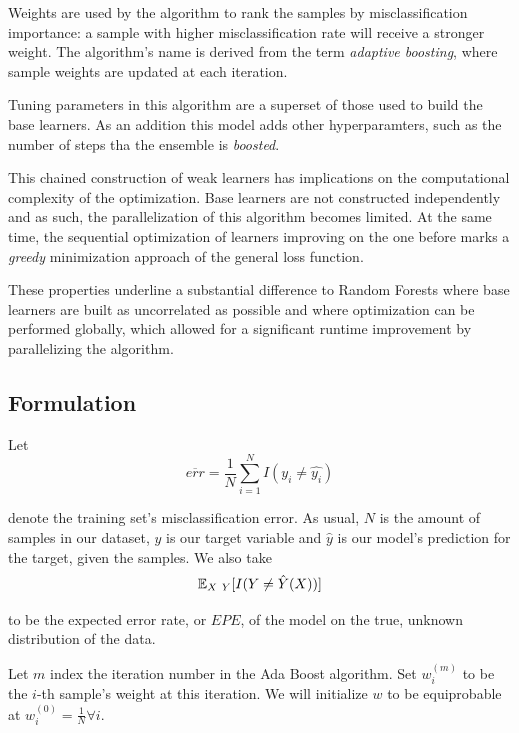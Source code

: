 Weights are used by the algorithm to rank the samples by misclassification importance: a sample with higher misclassification rate will receive a stronger weight.
The algorithm's name is derived from the term \textit{adaptive boosting}, where sample weights are updated at each iteration.

Tuning parameters in this algorithm are a superset of those used to build the base learners.
As an addition this model adds other hyperparamters, such as the number of steps tha the ensemble is \textit{boosted}.

This chained construction of weak learners has implications on the computational complexity of the optimization.
Base learners are not constructed independently and as such, the parallelization of this algorithm becomes limited.
At the same time, the sequential optimization of learners improving on the one before marks a \textit{greedy} minimization approach of the general loss function.

These properties underline a substantial difference to Random Forests where base learners are built as uncorrelated as possible and where optimization can be performed globally, which allowed for a significant runtime improvement by parallelizing the algorithm.

\subsection{Formulation}\label{subsection:adaboost_formulation}

Let
\begin{equation}\label{eq:adaBoostTrainingError}
\overline{err} = \frac{1}{N} \sum_{i=1}^{N} I(y_i \neq \hat{y_i})
\end{equation}

denote the training set's misclassification error.
As usual, $N$ is the amount of samples in our dataset, $y$ is our target variable and $\hat{y}$ is our model's prediction for the target, given the samples.
We also take
\begin{equation}
\operatorname{\mathbb{E}}_{X \ Y} [ I(Y \neq \hat{Y}(X)) ]
\end{equation}

to be the expected error rate, or $EPE$, of the model on the true, unknown distribution of the data.

Let $m$ index the iteration number in the Ada Boost algorithm.
Set $w^{(m)}_i$ to be the $i$-th sample's weight at this iteration.
We will initialize $w$ to be equiprobable at $w^{(0)}_i = \frac{1}{N} \forall i$.

